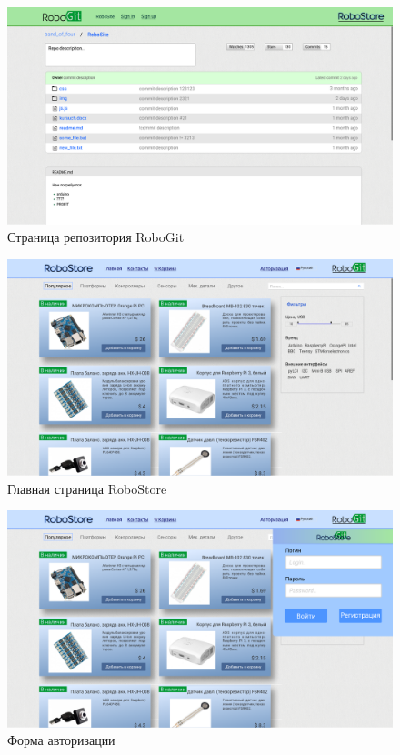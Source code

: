 \documentclass[12pt, a4paper]{article}
\begin{document}
\begin{figure}[H]
  \centering
  \includegraphics[width=16cm]{png/git_repo.png}
  \caption{Страница репозитория RoboGit}
\end{figure}

\begin{figure}[H]
  \centering
  \includegraphics[width=16cm]{png/store_main.png}
  \caption{Главная страница RoboStore}
\end{figure}

\begin{figure}[H]
  \centering
  \includegraphics[width=16cm]{png/store_auth.png}
  \caption{Форма авторизации}
\end{figure}
\end{document}
